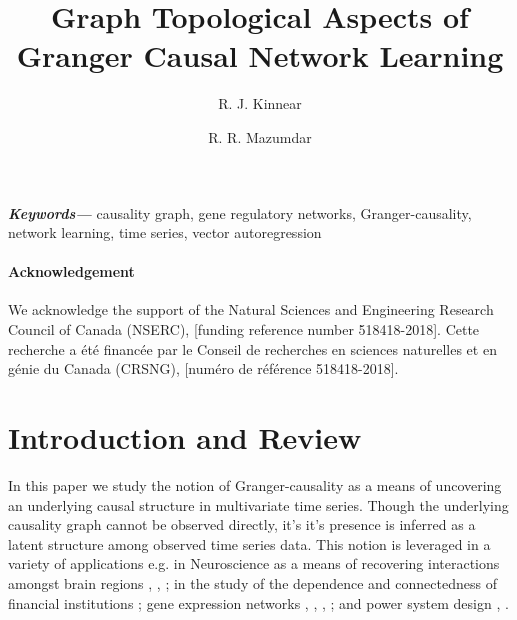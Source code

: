 \documentclass{statsoc}
\title{Graph Topological Aspects of Granger Causal Network Learning}
\author[Author 1 {\it et al.}]{R. J. Kinnear}
\author{R. R. Mazumdar}
\providecommand{\keywords}[1]{\textbf{\textit{Keywords---}} #1}
\begin{document}

\keywords{causality graph, gene regulatory networks,
  Granger-causality, network learning, time series, vector
  autoregression}

\paragraph{Acknowledgement}

We acknowledge the support of the Natural Sciences and Engineering Research Council of Canada (NSERC), [funding reference number 518418-2018].  Cette recherche a été financée par le Conseil de recherches en sciences naturelles et en génie du Canada (CRSNG), [numéro de référence 518418-2018].

\section{Introduction and Review}
\label{sec:introduction}
In this paper we study the notion of Granger-causality
\cite{granger1969investigating} \cite{Granger1980329} as a means of
uncovering an underlying causal structure in multivariate time series.
Though the underlying causality graph cannot be observed directly,
it's it's presence is inferred as a latent structure among observed
time series data.  This notion is leveraged in a variety of
applications e.g. in Neuroscience as a means of recovering
interactions amongst brain regions \cite{bressler2011wiener},
\cite{anna_paper2008}, \cite{david2008identifying}; in the study of
the dependence and connectedness of financial institutions
\cite{NBERw16223}; gene expression networks \cite{Fujita2007},
\cite{methods_for_inferring_gene_regulatory_networks_from_time_series_expression_data},
\cite{grouped_graphical_granger_modelling_for_gene_expression_regulatory_networks_discovery},
\cite{discovering_graphical_Granger_causality_using_the_truncating_lasso_penalty};
and power system design \cite{Misyrlis2016450}, \cite{yuan2014root}.
\end{document}
